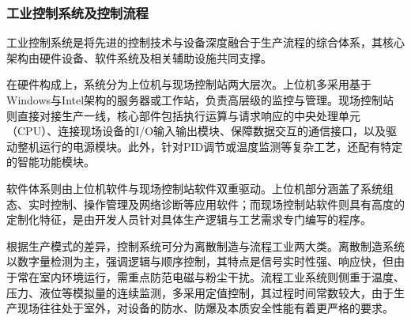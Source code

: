\documentclass{article}
\begin{document}
\subsubsection{工业控制系统及控制流程}
工业控制系统是将先进的控制技术与设备深度融合于生产流程的综合体系，其核心架构由硬件设备、软件系统及相关辅助设施共同支撑。\par
在硬件构成上，系统分为上位机与现场控制站两大层次。上位机多采用基于Windows与Intel架构的服务器或工作站，负责高层级的监控与管理。现场控制站则直接对接生产一线，核心部件包括执行运算与请求响应的中央处理单元（CPU）、连接现场设备的I/O输入输出模块、保障数据交互的通信接口，以及驱动整机运行的电源模块。此外，针对PID调节或温度监测等复杂工艺，还配有特定的智能功能模块。\par
软件体系则由上位机软件与现场控制站软件双重驱动。上位机部分涵盖了系统组态、实时控制、操作管理及网络诊断等应用软件；而现场控制站软件则具有高度的定制化特征，是由开发人员针对具体生产逻辑与工艺需求专门编写的程序。\par
根据生产模式的差异，控制系统可分为离散制造与流程工业两大类。离散制造系统以数字量检测为主，强调逻辑与顺序控制，其特点是信号实时性强、响应快，但由于常在室内环境运行，需重点防范电磁与粉尘干扰。流程工业系统则侧重于温度、压力、液位等模拟量的连续监测，多采用定值控制，其过程时间常数较大，由于生产现场往往处于室外，对设备的防水、防爆及本质安全性能有着更严格的要求。
\end{document}
